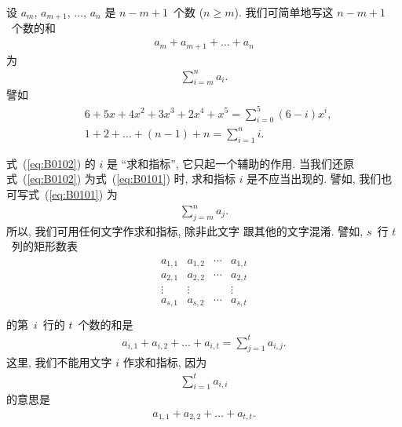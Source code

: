 \documentclass[%
    UTF8,%
    fontset=none,%
    punct=kaiming,%
    zihao=-4,%
    a4paper,%
    oneside,%
]{ctexbook}
\renewcommand*{\geq}{\geqslant}
\begin{document}
设 \(a_m\), \(a_{m+1}\), \(\dots\), \(a_n\) 是
\(n - m + 1\)~个数 (\(n \geq m\)).
我们可简单地写这 \(n - m + 1\)~个数的和
\begin{align}
    a_m + a_{m+1} + \dots + a_n
    \label{eq:B0101}
\end{align}
为
\begin{align}
    \sum_{i = m}^{n} {a_i}.
    \label{eq:B0102}
\end{align}
譬如
\begin{align*}
     & 6 + 5x + 4x^2 + 3x^3 + 2x^4 + x^5
    = \sum_{i = 0}^{5} {(6 - i)x^i},                       \\
     & 1 + 2 + \dots + (n - 1) + n = \sum_{i = 1}^{n} {i}.
\end{align*}

式~(\ref{eq:B0102}) 的 \(i\) 是 ``求和指标'',
它只起一个辅助的作用.
当我们还原式~(\ref{eq:B0102})
为式~(\ref{eq:B0101}) 时,
求和指标 \(i\) 是不应当出现的.
譬如, 我们也可写式~(\ref{eq:B0101}) 为
\begin{align*}
    \sum_{j = m}^{n} {a_j}.
\end{align*}
所以, 我们可用任何文字作求和指标, 除非此文字%
跟其他的文字混淆.
譬如, \(s\)~行 \(t\)~列的矩形数表
\begin{align}
    \begin{matrix}
        a_{1,1} & a_{1,2} & \cdots & a_{1,t} \\
        a_{2,1} & a_{2,2} & \cdots & a_{2,t} \\
        \vdots  & \vdots  & {}     & \vdots  \\
        a_{s,1} & a_{s,2} & \cdots & a_{s,t} \\
    \end{matrix}
    \label{eq:B0103}
\end{align}
的第~\(i\)~行的 \(t\)~个数的和是
\begin{align*}
    a_{i,1} + a_{i,2} + \dots + a_{i,t}
    = \sum_{j = 1}^{t} {a_{i,j}}.
\end{align*}
这里, 我们不能用文字 \(i\) 作求和指标,
因为
\begin{align*}
    \sum_{i = 1}^{t} {a_{i,i}}
\end{align*}
的意思是
\begin{align*}
    a_{1,1} + a_{2,2} + \dots + a_{t,t}.
\end{align*}
\end{document}
